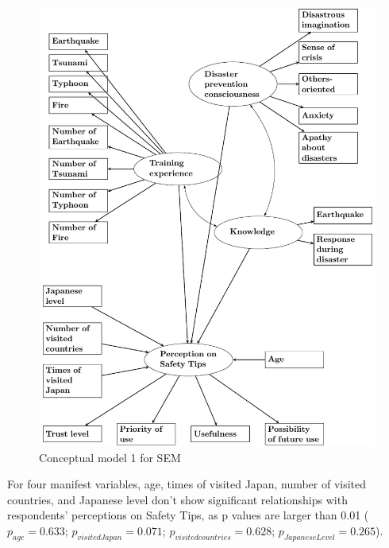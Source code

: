 \begin{figure}[h]
  \includegraphics[width=\linewidth]{Figure/Figure23.png}
  \centering
  \caption{Conceptual model 1 for SEM}
  \label{fig23}
\end{figure}

For four manifest variables, age, times of visited Japan, number of visited countries, and Japanese level don't show significant relationships with respondents' perceptions on Safety Tips, as p values are larger than 0.01 ($p_{age} =0.633$; $p_{visitedJapan} =0.071$; $p_{visitedcountries} =0.628$; $p_{JapaneseLevel} =0.265$). 

